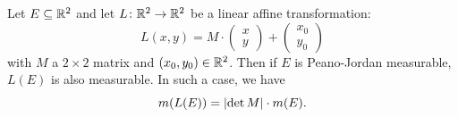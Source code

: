\begin{theorem}
\label{th:area_lineare}%
%
%
Let $E\subseteq {\mathbb R}^2$ and let $L\colon {\mathbb R}^2\to{\mathbb R}^2$ be a linear affine
transformation:
\[
  L(x,y) = M\cdot \begin{pmatrix}
    x \\ y
  \end{pmatrix}
  + \begin{pmatrix}
    x_0 \\ y_0
  \end{pmatrix}
\]
with $M$ a $2\times 2$ matrix and $(x_0 ,y_0)\in {\mathbb R}^2$.
Then if $E$ is Peano-Jordan measurable, $L(E)$ is also measurable. In such a
case, we have
\begin{equation}\label{eq:formula_area}
  m(L(E)) = {\left|\det M\right|} \cdot m(E).
\end{equation}
\end{theorem}
%
